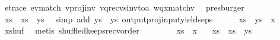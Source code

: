 \begin{isabellebody}
\ e{\isacharunderscore}{\kern0pt}trace{}\ e{\isacharunderscore}{\kern0pt}v{\isacharprime}{\kern0pt}{\isacharunderscore}{\kern0pt}match\ v{\isacharprime}{\kern0pt}{\isacharunderscore}{\kern0pt}proj{\isacharunderscore}{\kern0pt}inv\ v{\isacharprime}{\kern0pt}{\isacharunderscore}{\kern0pt}q{\isacharunderscore}{\kern0pt}recvs{\isacharunderscore}{\kern0pt}inv{\isacharunderscore}{\kern0pt}to{\isacharunderscore}{\kern0pt}a\ wqx{\isacharunderscore}{\kern0pt}match{\isacharunderscore}{\kern0pt}v{\isacharprime}{\kern0pt}\ \isamarkupfalse%
\ presburger\isanewline
\ \ \ \ \isamarkupfalse%
\ {\isachardoublequoteopen}xs{\isasymdown}\isactrlsub {\isacharquery}{\kern0pt}\ {\isacharequal}{\kern0pt}\ {\isacharparenleft}{\kern0pt}xs\ {\isasymsqdot}\ ys{\isacharparenright}{\kern0pt}{\isasymdown}\isactrlsub {\isacharquery}{\kern0pt}{\isachardoublequoteclose}\ \isamarkupfalse%
\ {\isacharparenleft}{\kern0pt}simp\ add{\isacharcolon}{\kern0pt}\ {\isacartoucheopen}ys{\isasymdown}\isactrlsub {\isacharbang}{\kern0pt}\ {\isacharequal}{\kern0pt}\ ys{\isacartoucheclose}\ output{\isacharunderscore}{\kern0pt}proj{\isacharunderscore}{\kern0pt}input{\isacharunderscore}{\kern0pt}yields{\isacharunderscore}{\kern0pt}eps{\isacharparenright}{\kern0pt}\isanewline
\ \ \ \ \isamarkupfalse%
\ {\isachardoublequoteopen}{\isacharparenleft}{\kern0pt}xs\ {\isasymsqdot}\ ys{\isacharparenright}{\kern0pt}{\isasymdown}\isactrlsub {\isacharquery}{\kern0pt}\ {\isacharequal}{\kern0pt}\ {\isacharparenleft}{\kern0pt}x{\isacharparenright}{\kern0pt}{\isasymdown}\isactrlsub {\isacharquery}{\kern0pt}{\isachardoublequoteclose}\ \isamarkupfalse%
\ x{\isacharunderscore}{\kern0pt}shuf\ \isamarkupfalse%
\ {\isacharparenleft}{\kern0pt}metis\ shuffled{\isacharunderscore}{\kern0pt}keeps{\isacharunderscore}{\kern0pt}recv{\isacharunderscore}{\kern0pt}order{\isacharparenright}{\kern0pt}\ \isanewline
\ \ \ \ \isamarkupfalse%
\ \isamarkupfalse%
\ {\isachardoublequoteopen}xs{\isasymdown}\isactrlsub {\isacharquery}{\kern0pt}\ {\isacharequal}{\kern0pt}\ {\isacharparenleft}{\kern0pt}x{\isacharparenright}{\kern0pt}{\isasymdown}\isactrlsub {\isacharquery}{\kern0pt}{\isachardoublequoteclose}\ \ \isamarkupfalse%
\ {\isacartoucheopen}xs{\isasymdown}\isactrlsub {\isacharquery}{\kern0pt}\ {\isacharequal}{\kern0pt}\ {\isacharparenleft}{\kern0pt}xs\ {\isasymsqdot}\ ys{\isacharparenright}{\kern0pt}{\isasymdown}\isactrlsub {\isacharquery}{\kern0pt}{\isacartoucheclose}\ \isamarkupfalse%

\end{isabellebody}
